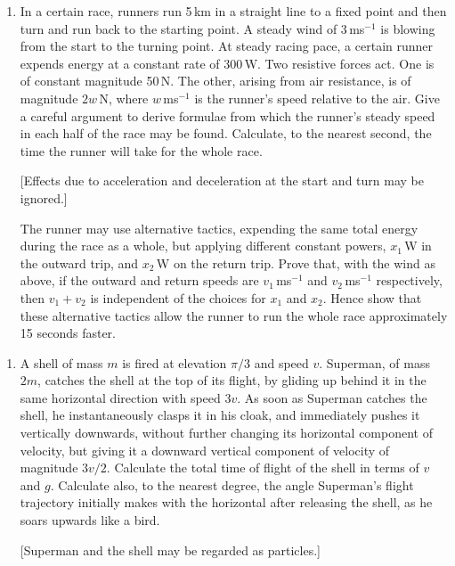 \documentclass[a4, 11pt]{report}
\newlength{\qspace}
\newcounter{qnumber}
\newenvironment{question}%
 {\vspace{\qspace}
  \begin{enumerate}[\bfseries 1\quad][10]%
    \setcounter{enumi}{\value{qnumber}}%
    \item%
 }
{
  \end{enumerate}
  \filbreak
  \stepcounter{qnumber}
 }
\begin{document}
	
\begin{question}
In a certain race, runners run 5$\,$km in a straight line to a fixed
point and then turn and run back to the starting point. A steady wind
of 3$\,$ms$^{-1}$ is blowing from the start to the turning point.
At steady racing pace, a certain runner expends energy at a constant
rate of 300$\,$W. Two resistive forces act. One is of constant magnitude
50$\,$N. The other, arising from air resistance, is of magnitude
$2w\,\mathrm{N}$, where $w\,$ms$^{-1}$ is the runner's speed relative
to the air. Give a careful argument to derive formulae from which
the runner's steady speed in each half of the race may be found. Calculate,
to the nearest second, the time the runner will take for the whole
race. 


{[}Effects due to acceleration and deceleration at the start and turn
may be ignored.{]}


The runner may use alternative tactics, expending the same total energy
during the race as a whole, but applying different constant powers,
$x_{1}\,$W in the outward trip, and $x_{2}\,$W on the return trip.
Prove that, with the wind as above, if the outward and return speeds
are $v_{1}\,$ms$^{-1}$ and $v_{2}\,$ms$^{-1}$ respectively, then
$v_{1}+v_{2}$ is independent of the choices for $x_{1}$ and $x_{2}$.
Hence show that these alternative tactics allow the runner to run
the whole race approximately 15 seconds faster. 
	\end{question}
	
\begin{question}	
A shell of mass $m$ is fired at elevation $\pi/3$ and speed $v$.
Superman, of mass $2m$, catches the shell at the top of its flight,
by gliding up behind it in the same horizontal direction with speed
$3v$. As soon as Superman catches the shell, he instantaneously clasps
it in his cloak, and immediately pushes it vertically downwards, without
further changing its horizontal component of velocity, but giving
it a downward vertical component of velocity of magnitude $3v/2$.
Calculate the total time of flight of the shell in terms of $v$ and
$g$. Calculate also, to the nearest degree, the angle Superman's
flight trajectory initially makes with the horizontal after releasing
the shell, as he soars upwards like a bird. 


{[}Superman and the shell may be regarded as particles.{]}
\end{question}

\end{document}
